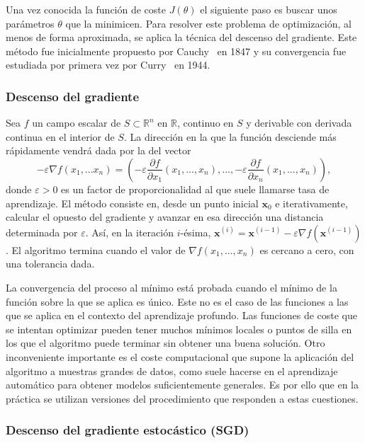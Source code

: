 Una vez conocida la función de coste $J(\theta)$ el siguiente paso es buscar unos parámetros $\theta$ que la minimicen. Para resolver este problema de optimización, al menos de forma aproximada, se aplica la técnica del descenso del gradiente. Este método fue inicialmente propuesto por Cauchy~\cite{cauchy1847methode} en 1847 y su convergencia fue estudiada por primera vez por Curry~\cite{curry1944method} en 1944.

\subsubsection{Descenso del gradiente}

Sea $f$ un campo escalar de $S \subset \mathbb{R}^n$ en $\mathbb{R}$, continuo en $S$ y derivable con derivada continua en el interior de $S$. La dirección en la que la función desciende más rápidamente vendrá dada por la del vector $$- \varepsilon \nabla f(x_1,...x_n) = \left( -\varepsilon \frac{\partial f}{\partial x_1}(x_1,...,x_n), ..., - \varepsilon \frac{\partial f}{\partial x_n}(x_1,...,x_n) \right),$$ donde $\varepsilon > 0$ es un factor de proporcionalidad al que suele llamarse tasa de aprendizaje. El método consiste en, desde un punto inicial $\textbf{x}_0$ e iterativamente, calcular el opuesto del gradiente y avanzar en esa dirección una distancia determinada por $\varepsilon$. Así, en la iteración $i$-ésima, $\textbf{x}^{(i)} = \textbf{x}^{(i-1)} - \varepsilon \nabla f(\textbf{x}^{(i-1)})$.  El algoritmo termina cuando el valor de $\nabla f(x_1,...,x_n)$ es cercano a cero, con una tolerancia dada.

La convergencia del proceso al mínimo está probada cuando el mínimo de la función sobre la que se aplica es único. Este no es el caso de las funciones a las que se aplica en el contexto del aprendizaje profundo. Las funciones de coste que se intentan optimizar pueden tener muchos mínimos locales o puntos de silla en los que el algoritmo puede terminar sin obtener una buena solución. Otro inconveniente importante es el coste computacional que supone la aplicación del algoritmo a muestras grandes de datos, como suele hacerse en el aprendizaje automático para obtener modelos suficientemente generales. Es por ello que en la práctica se utilizan versiones del procedimiento que responden a estas cuestiones.

\subsubsection{Descenso del gradiente estocástico (SGD)}

